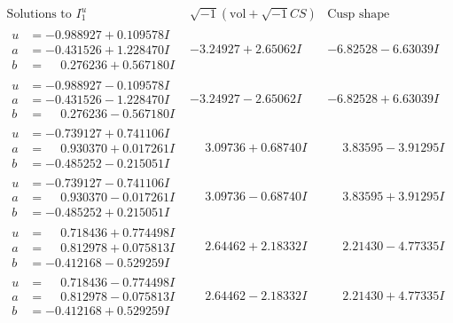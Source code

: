 \documentclass[1p]{elsarticle_modified}
\theoremstyle{definition}
\newcommand{\I}{\sqrt{-1}}
\begin{document}
$$\begin{array}{c|c|c}  
\text{Solutions to }I^u_{1}& \I (\text{vol} + \sqrt{-1}CS) & \text{Cusp shape}\\
 \hline 
\begin{aligned}
u &= -0.988927 + 0.109578 I \\
a &= -0.431526 + 1.228470 I \\
b &= \phantom{-}0.276236 + 0.567180 I\end{aligned}
 & -3.24927 + 2.65062 I & -6.82528 - 6.63039 I \\ \hline\begin{aligned}
u &= -0.988927 - 0.109578 I \\
a &= -0.431526 - 1.228470 I \\
b &= \phantom{-}0.276236 - 0.567180 I\end{aligned}
 & -3.24927 - 2.65062 I & -6.82528 + 6.63039 I \\ \hline\begin{aligned}
u &= -0.739127 + 0.741106 I \\
a &= \phantom{-}0.930370 + 0.017261 I \\
b &= -0.485252 - 0.215051 I\end{aligned}
 & \phantom{-}3.09736 + 0.68740 I & \phantom{-}3.83595 - 3.91295 I \\ \hline\begin{aligned}
u &= -0.739127 - 0.741106 I \\
a &= \phantom{-}0.930370 - 0.017261 I \\
b &= -0.485252 + 0.215051 I\end{aligned}
 & \phantom{-}3.09736 - 0.68740 I & \phantom{-}3.83595 + 3.91295 I \\ \hline\begin{aligned}
u &= \phantom{-}0.718436 + 0.774498 I \\
a &= \phantom{-}0.812978 + 0.075813 I \\
b &= -0.412168 - 0.529259 I\end{aligned}
 & \phantom{-}2.64462 + 2.18332 I & \phantom{-}2.21430 - 4.77335 I \\ \hline\begin{aligned}
u &= \phantom{-}0.718436 - 0.774498 I \\
a &= \phantom{-}0.812978 - 0.075813 I \\
b &= -0.412168 + 0.529259 I\end{aligned}
 & \phantom{-}2.64462 - 2.18332 I & \phantom{-}2.21430 + 4.77335 I \\ \hline\begin{aligned}

\end{aligned}
\end{array}$$
\end{document}
